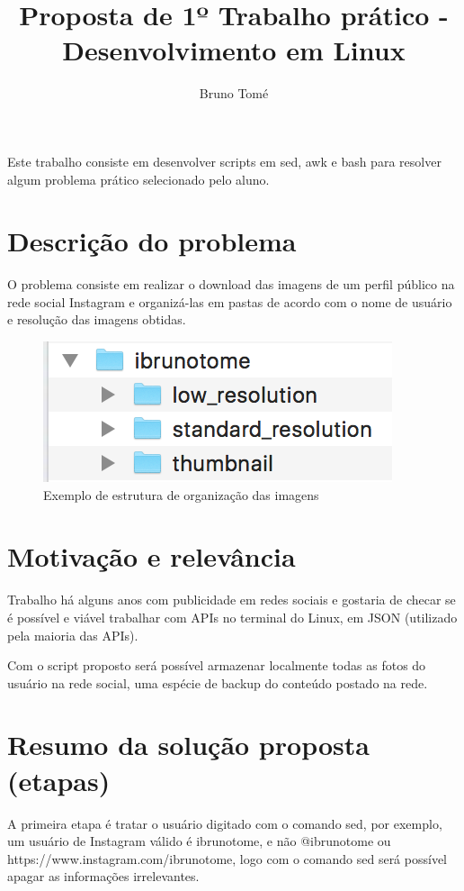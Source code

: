\documentclass[12pt]{article}
\title{Proposta de 1º Trabalho prático - Desenvolvimento em Linux}
\author{Bruno Tomé\inst{1}}
\begin{document}
 

\maketitle
     
\begin{resumo} 
	Este trabalho consiste em desenvolver scripts em sed, awk e bash para resolver algum problema prático selecionado pelo aluno.
\end{resumo}


\section{Descrição do problema}
	
	O problema consiste em realizar o download das imagens de um perfil público na rede social Instagram e organizá-las em pastas de acordo com o nome de usuário e resolução das imagens obtidas.
	
\begin{figure}[ht]
\centering
\includegraphics[width=.5\textwidth]{fig1}
\caption{Exemplo de estrutura de organização das imagens}
\end{figure}

\section{Motivação e relevância}
	
	Trabalho há alguns anos com publicidade em redes sociais e gostaria de checar se é possível e viável trabalhar com APIs no terminal do Linux, em JSON (utilizado pela maioria das APIs).
	
	Com o script proposto será possível armazenar localmente todas as fotos do usuário na rede social, uma espécie de backup do conteúdo postado na rede.
	
\section{Resumo da solução proposta (etapas)}

	A primeira etapa é tratar o usuário digitado com o comando sed, por exemplo, um usuário de Instagram válido é ibrunotome, e não @ibrunotome ou https://www.instagram.com/ibrunotome, logo com o comando sed será possível apagar as informações irrelevantes.
	
\end{document}
